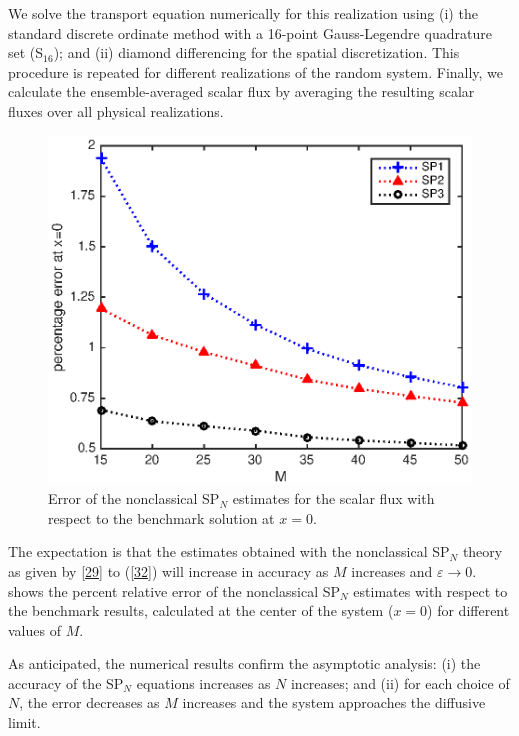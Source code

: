 \documentclass{anstrans}
\newcommand{\ep}{\varepsilon}
\begin{document}
We solve the transport equation numerically for this realization using (i) the standard discrete ordinate method with a 16-point Gauss-Legendre quadrature set (S$_{16}$); and (ii) diamond differencing for the spatial discretization.
This procedure is repeated for different realizations of the random system.
Finally, we calculate the ensemble-averaged scalar flux by averaging the resulting scalar fluxes over all physical realizations.
\begin{figure}[ht] %
  \centering
  \includegraphics[scale=0.74]{fig_spn}
  \caption{Error of the nonclassical SP$_N$ estimates for the scalar flux with respect to the benchmark solution at $x=0$.}
  \label{fig}
\end{figure}

The expectation is that the estimates obtained with the nonclassical SP$_N$ theory as given by \cref{29} to (\ref{32}) will increase in accuracy as $M$ increases and $\ep\rightarrow 0$.
 shows the percent relative error of the nonclassical SP$_N$ estimates with respect to the benchmark results, calculated at the center of the system ($x=0$) for different values of $M$. 

As anticipated, the numerical results confirm the asymptotic analysis: (i) the accuracy of the SP$_N$ equations increases as $N$ increases; and (ii) for each choice of $N$, the error decreases as $M$ increases and the system approaches the diffusive limit.

\end{document}
